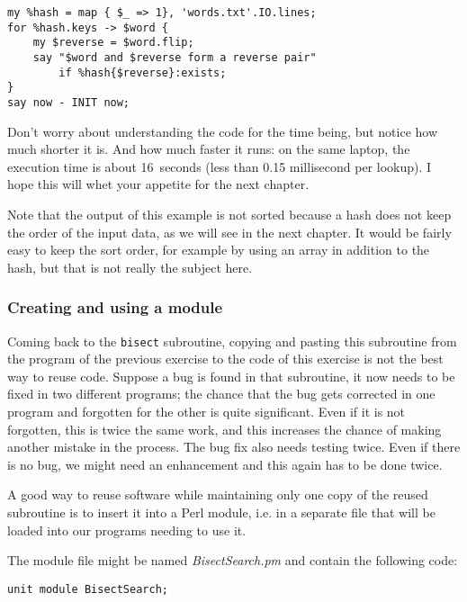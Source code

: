 {\begin{verbatim}
my %hash = map { $_ => 1}, 'words.txt'.IO.lines;
for %hash.keys -> $word {
    my $reverse = $word.flip;
    say "$word and $reverse form a reverse pair" 
        if %hash{$reverse}:exists;
}
say now - INIT now;
\end{verbatim}

Don't worry about understanding the code for the time 
being, but notice how much shorter it is. And how much 
faster it runs: on the same laptop, the execution time is 
about 16~seconds (less than 0.15 millisecond per lookup). 
I hope this will whet your appetite for the next  
chapter.

Note that the output of this example is not sorted because 
a hash does not keep the order of the input data, as we 
will see in the next chapter. It would be fairly easy to 
keep the sort order, for example by using an array in 
addition to the hash, but that is not really the 
subject here.

\subsubsection{Creating and using a module}

\label{bisect_module}
Coming back to the {\tt bisect} subroutine, copying 
and pasting this subroutine from the program of the 
previous exercise to the code of this exercise is 
not the best way to reuse code. Suppose a bug is 
found in that subroutine, it now needs to be fixed 
in two different programs; the chance that the bug gets 
corrected in one program and forgotten for the other 
is quite significant. Even if it is not forgotten, this 
is twice the same work, and this increases the chance 
of making another mistake in the process. The bug fix 
also needs testing twice. Even if there is no bug, we 
might need an enhancement and this again has to be done 
twice. 

A good way to reuse software while maintaining only 
one copy of the reused subroutine is to insert it into 
a Perl module, i.e. in a separate file that will be 
loaded into our programs needing to use it.

The module file might be named \emph{BisectSearch.pm} 
and contain the following code:

\begin{verbatim}
unit module BisectSearch;


\end{verbatim}}
